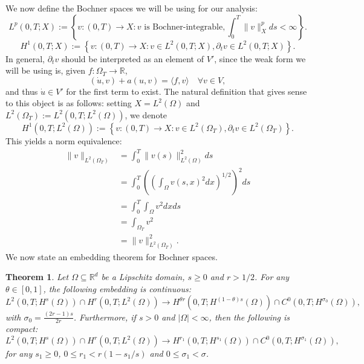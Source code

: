 \documentclass{article}
\newcommand{\R}{\mathbb{R}}
\newtheorem{theorem}{Theorem}
\begin{document}
We now define the Bochner spaces we will be using for our analysis:
\begin{equation*}
    L^p(0,T; X) := \left\{v:(0,T)\to X: v \text{ is Bochner-integrable}, \int_0^T \|v\|_X^p ds <\infty \right\}.
\end{equation*}
\begin{equation*}
    H^1(0,T; X) := \left\{v:(0,T)\to X: v\in L^2(0,T;X), \partial_t v\in L^2(0,T;X) \right\}.
\end{equation*}
In general, $\partial_t v$ should be interpreted as an element of $V'$, since the weak form we will be using is, given $f:\Omega_T\to \R$,
\begin{equation*}
    (\dot{u},v) + a(u,v) = \langle f, v\rangle \quad \forall v\in V,
\end{equation*}
and thus $\dot{u}\in V'$ for the first term to exist. The natural definition that gives sense to this object is as follows: setting $X=L^2(\Omega)$ and $L^2(\Omega_T) := L^2(0,T; L^2(\Omega))$, we denote
\begin{equation*}
    H^1(0,T;L^2(\Omega)) := \left\{v:(0,T)\to X: v\in L^2(\Omega_T), \partial_t v\in L^2(\Omega_T) \right\}.
\end{equation*}
This yields a norm equivalence:
\begin{align*}
    \|v\|_{L^2(\Omega_T)} &= \int_0^T \|v(s)\|_{L^2(\Omega)}^2 ds\\
    &= \int_0^T \left(\left(\int_\Omega v(s,x)^2 dx\right)^{1/2}\right)^2ds\\
    &= \int_0^T \int_\Omega v^2 dxds\\
    &= \int_{\Omega_T} v^2\\
    &= \|v\|^2_{L^2(\Omega_T)}.
\end{align*}
We now state an embedding theorem for Bochner spaces.
\begin{theorem}
    Let $\Omega\subseteq \R^d$ be a Lipschitz domain, $s\geq 0$ and $r>1/2$. For any $\theta\in[0,1]$, the following embedding is continuous:
    \begin{equation*}
        L^2(0,T;H^s(\Omega))\cap H^r(0,T;L^2(\Omega)) \longrightarrow H^{\theta r}(0,T;H^{(1-\theta)s}(\Omega))\cap C^0(0,T;H^{\sigma_0}(\Omega)),
    \end{equation*}
    with $\sigma_0 = \frac{(2r-1)s}{2r}$. Furthermore, if $s>0$ and $|\Omega|<\infty$, then the following is compact:
    \begin{equation*}
        L^2(0,T;H^s(\Omega))\cap H^r(0,T;L^2(\Omega)) \longrightarrow H^{r_1}(0,T;H^{s_1}(\Omega))\cap C^0(0,T;H^{\sigma_1}(\Omega)),
    \end{equation*}
    for any $s_1\geq 0$, $0\leq r_1 < r(1-s_1/s)$ and $0\leq \sigma_1 < \sigma$.
\end{theorem}
\end{document}

